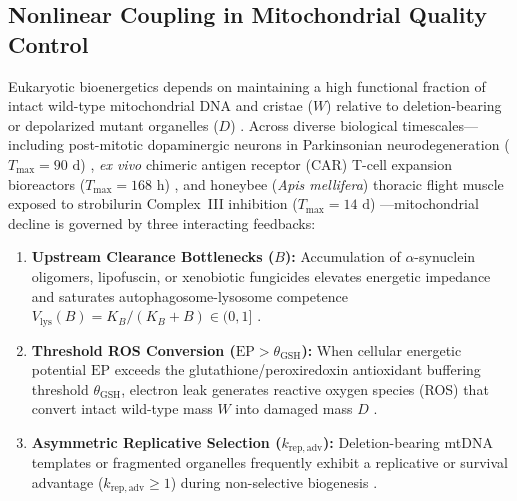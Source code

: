 \documentclass[11pt]{article}
\theoremstyle{plain}
\theoremstyle{remark}
\begin{document}
\subsection{Nonlinear Coupling in Mitochondrial Quality Control}
Eukaryotic bioenergetics depends on maintaining a high functional fraction of intact wild-type mitochondrial DNA and cristae ($W$) relative to deletion-bearing or depolarized mutant organelles ($D$) \cite{wallace2012mitochondrial,stewart2015purifying,aryaman2019stochastic}. Across diverse biological timescales---including post-mitotic dopaminergic neurons in Parkinsonian neurodegeneration ($T_{\max} = 90\text{ d}$) \cite{surmeier2017selective,bolam2012living}, \textit{ex vivo} chimeric antigen receptor (CAR) T-cell expansion bioreactors ($T_{\max} = 168\text{ h}$) \cite{fraietta2018determinants,sukumar2013inhibiting,buck2016mitochondrial}, and honeybee (\textit{Apis mellifera}) thoracic flight muscle exposed to strobilurin Complex~III inhibition ($T_{\max} = 14\text{ d}$) \cite{degrandi2015fungicides,seehuus2006bee}---mitochondrial decline is governed by three interacting feedbacks:
\begin{enumerate}
  \item \textbf{Upstream Clearance Bottlenecks ($B$):} Accumulation of $\alpha$-synuclein oligomers, lipofuscin, or xenobiotic fungicides elevates energetic impedance and saturates autophagosome-lysosome competence $V_{\mathrm{lys}}(B) = K_B / (K_B + B) \in (0, 1]$ \cite{surmeier2017selective,ryu2016urolithin}.
  \item \textbf{Threshold ROS Conversion ($\mathrm{EP} > \theta_{\mathrm{GSH}}$):} When cellular energetic potential $\mathrm{EP}$ exceeds the glutathione/peroxiredoxin antioxidant buffering threshold $\theta_{\mathrm{GSH}}$, electron leak generates reactive oxygen species (ROS) that convert intact wild-type mass $W$ into damaged mass $D$ \cite{picard2025energy}.
  \item \textbf{Asymmetric Replicative Selection ($k_{\mathrm{rep,adv}}$):} Deletion-bearing mtDNA templates or fragmented organelles frequently exhibit a replicative or survival advantage ($k_{\mathrm{rep,adv}} \ge 1$) during non-selective biogenesis \cite{stewart2015purifying,kowald2014mtDNA}.
\end{enumerate}
\end{document}
